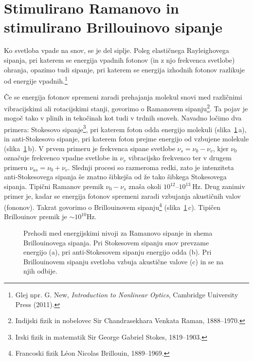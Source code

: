 \section{Stimulirano Ramanovo in stimulirano Brillouinovo sipanje}
\label{chap:SRS}
Ko svetloba vpade na snov, se je del siplje. Poleg elastičnega 
Rayleighovega sipanja,
pri katerem se energija vpadnih fotonov (in z njo frekvenca svetlobe) ohranja, opazimo 
tudi sipanje, pri katerem se energija izhodnih fotonov razlikuje od energije 
vpadnih.\footnote{Glej npr. G. New, {\it Introduction
to Nonlinear Optics}, Cambridge University Press (2011).} 

Če se energija fotonov spremeni zaradi prehajanja molekul snovi med različnimi
vibracijskimi ali rotacijskimi stanji, govorimo o Ramanovem
sipanju\footnote{Indijski fizik in nobelovec Sir Chandrasekhara Venkata Raman, 1888--1970.}. 
Ta pojav je mogoč tako v plinih in tekočinah kot tudi v trdnih snoveh. Navadno 
ločimo dva primera: Stokesovo sipanje\footnote{Irski fizik in matematik Sir George Gabriel
Stokes, 1819--1903.}, pri katerem foton odda energijo molekuli (slika~\ref{08_Raman}\,a),
in anti-Stokesovo sipanje,
pri katerem foton prejme energijo od vzbujene molekule (slika~\ref{08_Raman}\,b).
V prvem primeru je frekvenca
sipane svetlobe $\nu_s=\nu_0-\nu_v$, kjer $\nu_0$ označuje frekvenco vpadne
svetlobe in $\nu_v$ vibracijsko frekvenco ter v drugem primeru $\nu_{as}=\nu_0+\nu_v$.
Slednji procesi so razmeroma redki, zato je intenziteta anti-Stokesovega sipanja 
še znatno šibkejša od že tako šibkega Stokesovega sipanja. Tipični Ramanov premik 
$\nu_0-\nu_s$ znaša okoli $10^{12}$--$10^{13}~\si{\hertz}$.
Drug zanimiv primer je, kadar se energija fotonov spremeni zaradi 
vzbujanja akustičnih valov (fononov). Takrat govorimo o Brillouinovem 
sipanju\footnote{Francoski fizik L\'eon Nicolas Brillouin, 1889--1969.} (slika~\ref{08_Raman}\,c).
Tipičen Brillouinov premik je $\sim 10^{10}\si{\hertz}$. 

\begin{figure}[h]
\centering
\def\svgwidth{140truemm} 

\caption{Prehodi med energijskimi nivoji za Ramanovo sipanje in shema Brillouinovega sipanja. 
Pri Stokesovem sipanju snov prevzame energijo (a), pri anti-Stokesovem sipanju energijo odda (b).
Pri Brillouinovem sipanju svetloba vzbuja akustične valove (c) in se na njih odbije.}
\label{08_Raman}
\end{figure}

